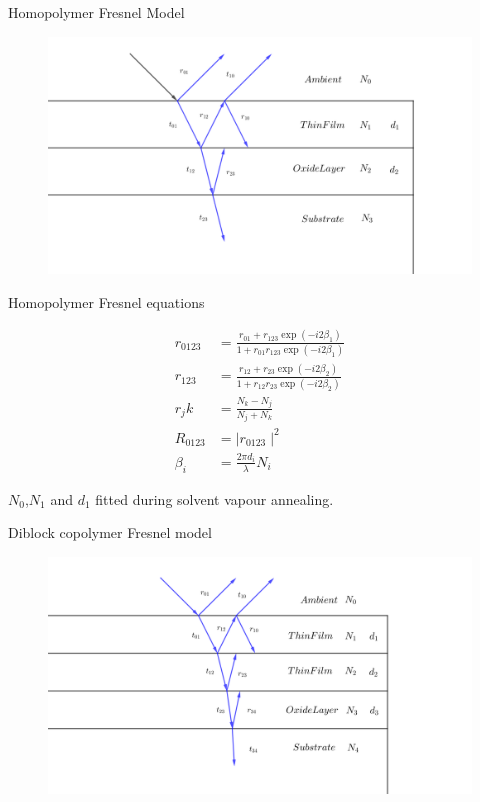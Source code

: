 \documentclass[10pt]{beamer}
\begin{document}
\begin{frame}{Homopolymer Fresnel Model}
	\begin{figure}
	\centering
	\includegraphics[width=\textwidth]{figmulti1.png}
	\end{figure}
\end{frame}
\begin{frame}{Homopolymer Fresnel equations}


\begin{align*}
r_{0123} &= \frac{r_{01}+r_{123}\exp{(-i2\beta_1)}}{1+r_{01}r_{123}\exp{(-i2\beta_1)}}\\
r_{123} &= \frac{r_{12}+r_{23}\exp{(-i2\beta_2)}}{1+r_{12}r_{23}\exp{(-i2\beta_2)}}\\
r_jk &= \frac{N_k-N_j}{N_j+N_k}\\
R_{0123} &= \mid r_{0123} \mid ^2 \\
\beta_i &= \frac{2\pi d_i}{\lambda}N_i
\end{align*}

$N_0$,$N_1$ and $d_1$ fitted during solvent vapour annealing.

\end{frame}

\begin{frame}{Diblock copolymer Fresnel model}
	\begin{figure}
	\centering
	\includegraphics[width=\textwidth]{diblock.png}
\end{figure}
\end{frame}
\end{document}
